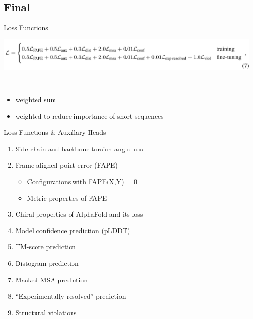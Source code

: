 \documentclass[presentation, smaller]{beamer}
\begin{document}
\subsection*{Final}
\label{sec:orgbabc6ea}
\begin{frame}[label={sec:orgde9291a}]{Loss Functions}
\begin{center}
\includegraphics[width=.9\linewidth]{./imgs/loss-eq.png}
\end{center}~\cite{jumperHighlyAccurateProtein2021}

\begin{itemize}
\item weighted sum
\item weighted to reduce importance of short sequences
\end{itemize}
\end{frame}
\begin{frame}[label={sec:org4533e99}]{Loss Functions \& Auxillary Heads}
\begin{enumerate}
\item Side chain and backbone torsion angle loss
\item Frame aligned point error (FAPE)
\begin{itemize}
\item Configurations with FAPE(X,Y) = 0
\item Metric properties of FAPE
\end{itemize}
\item Chiral properties of AlphaFold and its loss
\item Model confidence prediction (pLDDT)
\item TM-score prediction
\item Distogram prediction
\item Masked MSA prediction
\item ``Experimentally resolved'' prediction
\item Structural violations
\end{enumerate}~\cite{jumperHighlyAccurateProtein2021}
\end{frame}
\end{document}
